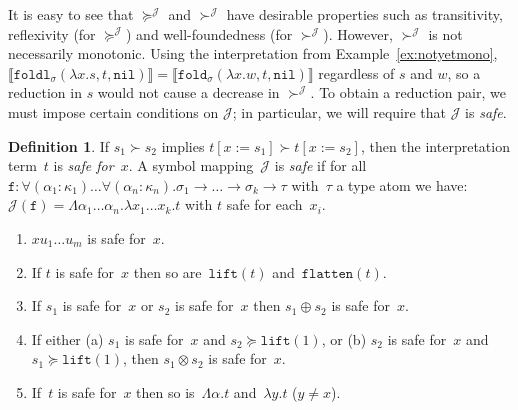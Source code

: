\documentclass[a4paper,UKenglish,cleveref,autoref,numberwithinsect]{lipics-v2019}
\theoremstyle{definition}
\newtheorem{defn}[theorem]{Definition}
\newcommand{\arrtype}{\rightarrow}
\newcommand{\subst}[2]{#1:=#2}
\newcommand{\abs}[2]{\lambda #1.#2}
\newcommand{\tabs}[2]{\Lambda #1.#2}
\newcommand{\flatten}{\mathtt{flatten}}
\newcommand{\lift}{\mathtt{lift}}
\newcommand{\interpret}[1]{\llbracket #1 \rrbracket}
\newcommand{\Termmap}{\mathcal{J}}
\newcommand{\succinterpret}{\succ^{\Termmap}}
\newcommand{\succeqinterpret}{\succeq^{\Termmap}}
\newcommand{\nil}{\mathtt{nil}}
\newcommand{\xlet}[4]{\mathtt{let}_{#1}\,#2\,\mathtt{be}\,[#3]\,\mathtt{in}\,#4}
\begin{document}
It is easy to see that $\succeqinterpret$ and
$\succinterpret$ have desirable properties such as transitivity,
reflexivity (for $\succeqinterpret$) and well-foundedness (for
$\succinterpret$).  However, $\succinterpret$ is not necessarily
monotonic.  Using the interpretation from Example~\ref{ex:notyetmono},
$\interpret{\mathtt{foldl}_{\sigma}(\abs{x}{s},t,\nil)} =
\interpret{\mathtt{fold}_{\sigma}(\abs{x}{w},t,\nil)}$ regardless of
$s$ and $w$, so a reduction in $s$ would not cause a decrease in
$\succinterpret$.  To obtain a reduction pair, we must impose certain
conditions on $\Termmap$; in particular, we will require that
$\Termmap$ is \emph{safe}.

\begin{defn}\label{def_safe}
  If $s_1 \succ s_2$ implies $t[\subst{x}{s_1}] \succ
  t[\subst{x}{s_2}]$, then the interpretation term~$t$ is \emph{safe
    for~$x$}. A symbol mapping~$\Termmap$ is \emph{safe} if for all
  $
  \mathtt{f} : \forall (\alpha_1 : \kappa_1) \ldots \forall (\alpha_n
  : \kappa_n) . \sigma_1 \arrtype \ldots \arrtype \sigma_k \arrtype
  \tau
$
  with~$\tau$ a type atom we have: $\Termmap(\mathtt{f}) =
  \tabs{\alpha_1 \dots \alpha_n}{\abs{x_1 \dots x_k}{t}}$ with $t$
  safe for each~$x_i$.
\end{defn}

\begin{lemma}\label{lem_safe}
  \begin{enumerate}
  \item $x u_1 \ldots u_m$ is safe for~$x$.
  \item If $t$ is safe for~$x$ then so are~$\lift(t)$
    and~$\flatten(t)$.
  \item If $s_1$ is safe for~$x$ or $s_2$ is safe for~$x$ then $s_1
    \oplus s_2$ is safe for~$x$.
  \item If either
      (a)
      $s_1$ is safe for~$x$ and $s_2 \succeq \lift(1)$, or
      (b)
      $s_2$ is safe for~$x$ and $s_1 \succeq \lift(1)$,
    then $s_1 \otimes s_2$ is safe for~$x$.
  \item If~$t$ is safe for~$x$ then so is~$\tabs{\alpha}{t}$
    and~$\abs{y}{t}$ ($y \ne x$).
  \end{enumerate}
\end{lemma}
\end{document}
